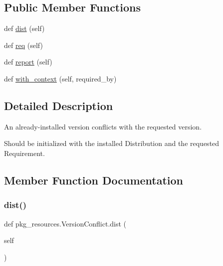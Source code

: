 \subsection*{Public Member Functions}
\begin{DoxyCompactItemize}
\item 
def \hyperlink{classpkg__resources_1_1VersionConflict_aa9fbb5b0a8a3eca7fd7b68590df60925}{dist} (self)
\item 
def \hyperlink{classpkg__resources_1_1VersionConflict_aa58b2603058699b5edf24f1e207bfd21}{req} (self)
\item 
def \hyperlink{classpkg__resources_1_1VersionConflict_ad51962e2f25f4ac8eb21238f202e8291}{report} (self)
\item 
def \hyperlink{classpkg__resources_1_1VersionConflict_a72f5accef580cb14e1f08211a22e114f}{with\+\_\+context} (self, required\+\_\+by)
\end{DoxyCompactItemize}


\subsection{Detailed Description}
\begin{DoxyVerb}An already-installed version conflicts with the requested version.

Should be initialized with the installed Distribution and the requested
Requirement.
\end{DoxyVerb}
 

\subsection{Member Function Documentation}
\mbox{\label{classpkg__resources_1_1VersionConflict_aa9fbb5b0a8a3eca7fd7b68590df60925}} 
\subsubsection{\texorpdfstring{dist()}{dist()}}
{\footnotesize\ttfamily def pkg\+\_\+resources.\+Version\+Conflict.\+dist (\begin{DoxyParamCaption}\item[{}]{self }\end{DoxyParamCaption})}

